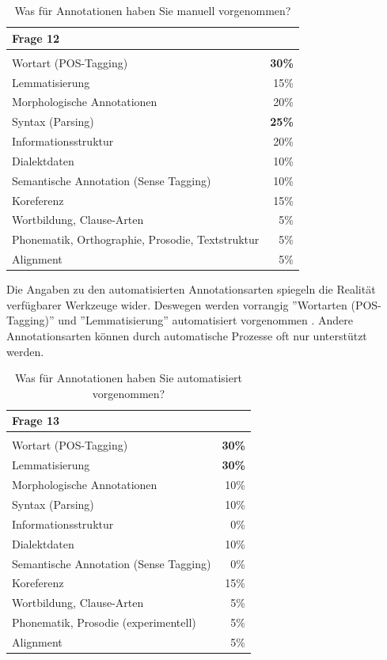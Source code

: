 	\begin{table}[H]
		\centering
		\begin{tabular}{l | r}
					Frage 12 &  \\
					\hline\\
					Wortart (POS-Tagging)					& \bf{30\%} \\
					Lemmatisierung						&  15\% \\
					Morphologische Annotationen				&  20\% \\
					Syntax (Parsing)						& \bf{25\%} \\
					Informationsstruktur						& 20\% \\
					Dialektdaten							& 10\% \\
					Semantische Annotation (Sense Tagging) 	& 10\% \\
					Koreferenz 							& 15\% \\
					\hline
					Wortbildung, Clause-Arten 		& 5\% \\
					Phonematik, Orthographie, Prosodie, Textstruktur & 5\% \\
					Alignment					& 5\% 
		\end{tabular}
		\caption{Was für Annotationen haben Sie manuell vorgenommen?}\label{tab:Frage12}
	\end{table}

Die Angaben zu den automatisierten Annotationsarten spiegeln die Realität verfügbarer Werkzeuge wider. Deswegen werden vorrangig ''Wortarten (POS-Tagging)'' und ''Lemmatisierung'' automatisiert vorgenommen \citep[vgl.][]{schmid94treetagger}. Andere Annotationsarten können durch automatische Prozesse oft nur unterstützt werden.
	
	\begin{table}[H]
		\centering
		\begin{tabular}{l | r}
					Frage 13 &  \\
					\hline\\
					Wortart (POS-Tagging)					& \bf{30\%} \\
					Lemmatisierung						&  \bf{30\%} \\
					Morphologische Annotationen				&  10\% \\
					Syntax (Parsing)						& 10\% \\
					Informationsstruktur						& 0\% \\
					Dialektdaten							& 10\% \\
					Semantische Annotation (Sense Tagging) 	& 0\% \\
					Koreferenz 							& 15\% \\
					\hline
					Wortbildung, Clause-Arten 		& 5\% \\
					Phonematik, Prosodie (experimentell) & 5\% \\
					Alignment					& 5\% 
		\end{tabular}
		\caption{Was für Annotationen haben Sie automatisiert vorgenommen?}\label{tab:Frage13}
	\end{table}

